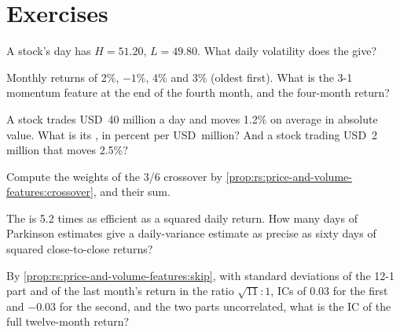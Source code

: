 \section{Exercises}

\begin{exercise}[$\star$]\label{exo:rs:price-and-volume-features:1}
A stock's day has $H = 51.20$, $L = 49.80$. What daily volatility does the  give?
\end{exercise}

\begin{exercise}[$\star$]\label{exo:rs:price-and-volume-features:2}
Monthly returns of 2\%, $-1\%$, 4\% and 3\% (oldest first). What is the 3-1 momentum feature at the end of the fourth month, and the
four-month return?
\end{exercise}

\begin{exercise}[$\star$]\label{exo:rs:price-and-volume-features:3}
A stock trades USD~40 million a day and moves 1.2\% on average in absolute value. What is its , in percent per
USD~million? And a stock trading USD~2 million that moves 2.5\%?
\end{exercise}

\begin{exercise}[$\star\star$]\label{exo:rs:price-and-volume-features:4}
Compute the weights of the 3/6 crossover by \cref{prop:rs:price-and-volume-features:crossover}, and their sum.
\end{exercise}

\begin{exercise}[$\star\star$]\label{exo:rs:price-and-volume-features:5}
The  is 5.2 times as efficient as a squared daily return. How many days of Parkinson estimates give a daily-variance
estimate as precise as sixty days of squared close-to-close returns?
\end{exercise}

\begin{exercise}[$\star\star$]\label{exo:rs:price-and-volume-features:6}
By \cref{prop:rs:price-and-volume-features:skip}, with standard deviations of the 12-1 part and of the last month's return in the ratio
$\sqrt{11}:1$, ICs of 0.03 for the first and $-0.03$ for the second, and the two parts uncorrelated, what is the IC of the full
twelve-month return?
\end{exercise}

